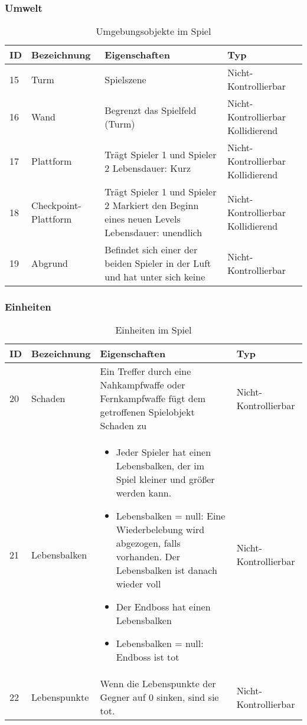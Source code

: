 \documentclass[11pt]{article}
\begin{document}
\begin{table}[htbp]
\subsubsection*{Umwelt}
\centering
\begin{tabular}{|p{}|p{}|p{}|p{}|}
\hline
\textbf{ID} & \textbf{Bezeichnung} & \textbf{Eigenschaften} & \textbf{Typ} \\
\hline
15 & Turm & Spielszene & Nicht-Kontrollierbar \\
\hline
16 & Wand & Begrenzt das Spielfeld (Turm) & Nicht-Kontrollierbar
Kollidierend
 \\
\hline
17 & Plattform & Trägt Spieler 1 und Spieler 2
Lebensdauer: Kurz & Nicht-Kontrollierbar
Kollidierend \\
\hline
18 & Checkpoint-Plattform & Trägt Spieler 1 und Spieler 2 Markiert den Beginn eines neuen Levels Lebensdauer: unendlich
&Nicht-Kontrollierbar Kollidierend\\
\hline
19 & Abgrund & Befindet sich einer der beiden Spieler in der Luft und hat unter sich keine  & Nicht-Kontrollierbar \\
\hline
\end{tabular}
\caption{Umgebungsobjekte im Spiel}
\end{table}

\begin{table}[htbp]
\subsubsection*{Einheiten}
\centering
\begin{tabular}{|p{}|p{}|p{}|p{}|}
\hline
\textbf{ID} & \textbf{Bezeichnung} & \textbf{Eigenschaften} & \textbf{Typ} \\
\hline
20 & Schaden & Ein Treffer durch eine Nahkampfwaffe oder Fernkampfwaffe fügt dem getroffenen Spielobjekt Schaden zu & Nicht-Kontrollierbar \\
\hline
21 & Lebensbalken & 
\begin{itemize}
    \item Jeder Spieler hat einen Lebensbalken, der im Spiel kleiner und größer werden kann.

    \item Lebensbalken = null: Eine Wiederbelebung wird abgezogen, falls vorhanden. Der Lebensbalken ist danach wieder voll
    \item Der Endboss hat einen Lebensbalken

    \item Lebensbalken = null: Endboss ist tot

\end{itemize} & Nicht-Kontrollierbar \\
\hline
22 & Lebenspunkte & Wenn die Lebenspunkte der Gegner auf 0 sinken, sind sie tot. & Nicht-Kontrollierbar \\
\hline
\end{tabular}
\caption{Einheiten im Spiel}
\end{table}
\end{document}
